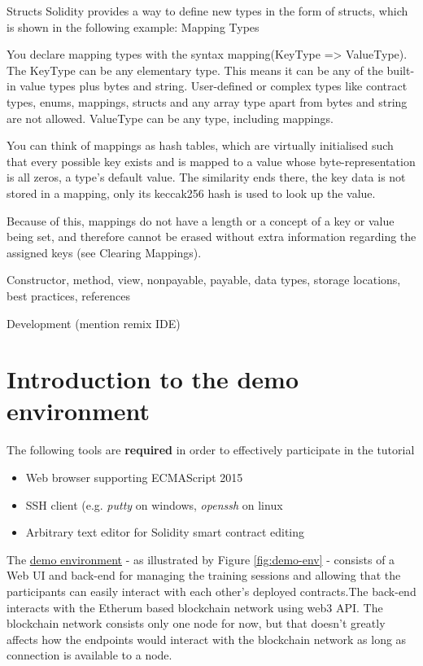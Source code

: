 \documentclass[a4paper]{article}
\begin{document}
Structs
Solidity provides a way to define new types in the form of structs, which is shown in the following example:
Mapping Types

You declare mapping types with the syntax mapping(KeyType => ValueType). The KeyType can be any elementary type. This means it can be any of the built-in value types plus bytes and string. User-defined or complex types like contract types, enums, mappings, structs and any array type apart from bytes and string are not allowed. ValueType can be any type, including mappings.

You can think of mappings as hash tables, which are virtually initialised such that every possible key exists and is mapped to a value whose byte-representation is all zeros, a type’s default value. The similarity ends there, the key data is not stored in a mapping, only its keccak256 hash is used to look up the value.

Because of this, mappings do not have a length or a concept of a key or value being set, and therefore cannot be erased without extra information regarding the assigned keys (see Clearing Mappings).

Constructor, method, view, nonpayable, payable, data types, storage locations, best practices, references 

Development (mention remix IDE)

\section{Introduction to the demo environment}

The following tools are \textbf{required} in order to effectively participate in the tutorial
\begin{itemize}
    \item Web browser supporting ECMAScript 2015
    \item SSH client (e.g. \emph{putty} on windows, \emph{openssh} on linux
    \item Arbitrary text editor for Solidity smart contract editing
\end{itemize}{}

The \href{https://blockchain.cnsm2019-tutorial.com/}{demo environment} - as illustrated by Figure \ref{fig:demo-env} - consists of a Web UI and back-end for managing the training sessions and allowing that the participants can easily interact with each other's deployed contracts.The back-end interacts with the Etherum based blockchain network using web3 API. The blockchain network consists only one node for now, but that doesn't greatly affects how the endpoints would interact with the blockchain network as long as connection is available to a node.
\end{document}

